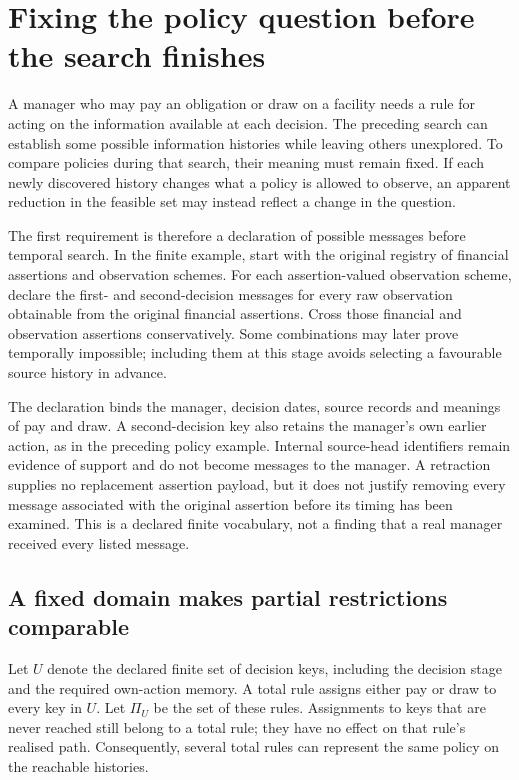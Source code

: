 \section{Fixing the policy question before the search finishes}
\label{sim:prospective-partial-policy}

A manager who may pay an obligation or draw on a facility needs a rule for acting on the information available at each decision. The preceding search can establish some possible information histories while leaving others unexplored. To compare policies during that search, their meaning must remain fixed. If each newly discovered history changes what a policy is allowed to observe, an apparent reduction in the feasible set may instead reflect a change in the question.

The first requirement is therefore a declaration of possible messages before temporal search. In the finite example, start with the original registry of financial assertions and observation schemes. For each assertion-valued observation scheme, declare the first- and second-decision messages for every raw observation obtainable from the original financial assertions. Cross those financial and observation assertions conservatively. Some combinations may later prove temporally impossible; including them at this stage avoids selecting a favourable source history in advance.

The declaration binds the manager, decision dates, source records and meanings of pay and draw. A second-decision key also retains the manager's own earlier action, as in the preceding policy example. Internal source-head identifiers remain evidence of support and do not become messages to the manager. A retraction supplies no replacement assertion payload, but it does not justify removing every message associated with the original assertion before its timing has been examined. This is a declared finite vocabulary, not a finding that a real manager received every listed message.

\subsection{A fixed domain makes partial restrictions comparable}

Let $U$ denote the declared finite set of decision keys, including the decision stage and the required own-action memory. A total rule assigns either pay or draw to every key in $U$. Let $\Pi_U$ be the set of these rules. Assignments to keys that are never reached still belong to a total rule; they have no effect on that rule's realised path. Consequently, several total rules can represent the same policy on the reachable histories.

